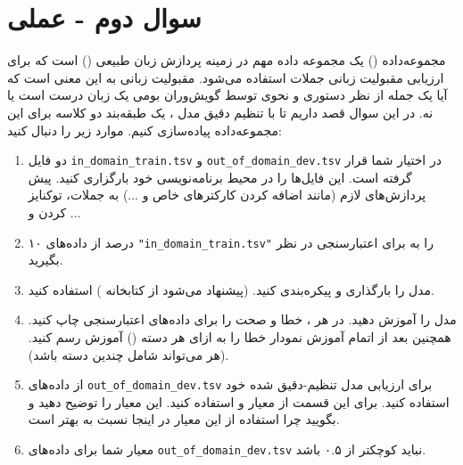\section{سوال دوم - عملی}

مجموعه‌داده  () یک مجموعه داده مهم در زمینه پردازش زبان طبیعی () است که برای ارزیابی مقبولیت زبانی جملات استفاده می‌شود. مقبولیت زبانی به این معنی است که آیا یک جمله از نظر دستوری و نحوی توسط گویش‌وران بومی یک زبان درست است یا نه. در این سوال قصد داریم تا با تنظیم دقیق مدل ، یک طبقه‌بند دو کلاسه برای این مجموعه‌داده پیاده‌سازی کنیم. موارد زیر را دنبال کنید:



\begin{enumerate}
	\item 
	دو فایل \texttt{in\_domain\_train.tsv} و \texttt{out\_of\_domain\_dev.tsv} در اختیار شما قرار گرفته است. این فایل‌ها را در محیط برنامه‌نویسی خود بارگزاری کنید. پیش پردازش‌های لازم (مانند اضافه کردن کارکترهای خاص \lr{[SEP]} و ...) به جملات، توکنایز کردن و ...
	
	
	\item 
۱۰ درصد از داده‌های \texttt{"in\_domain\_train.tsv"} را به برای اعتبارسنجی در نظر بگیرید.
	
	
	
	\item 
مدل  را بارگذاری و پیکره‌بندی کنید. (پیشنهاد می‌شود از کتابخانه ) استفاده کنید.



	\item 
مدل را آموزش دهید. در هر ، خطا و صحت را برای داده‌های اعتبارسنجی چاپ کنید. همچنین بعد از اتمام آموزش نمودار خطا را به ازای هر دسته () آموزش رسم کنید. (هر  می‌تواند شامل چندین دسته باشد).
	
	
	\item 
از داده‌های \texttt{out\_of\_domain\_dev.tsv} برای ارزیابی مدل تنظیم-دقیق شده خود استفاده کنید. برای این قسمت از معیار  و  استفاده کنید. این معیار را توضیح دهید و بگویید چرا استفاده از این معیار در اینجا نسبت به  بهتر است.

	
	\item 
معیار  شما برای داده‌های \texttt{out\_of\_domain\_dev.tsv} نباید کوچکتر از ۰.۵ باشد.

\end{enumerate}







